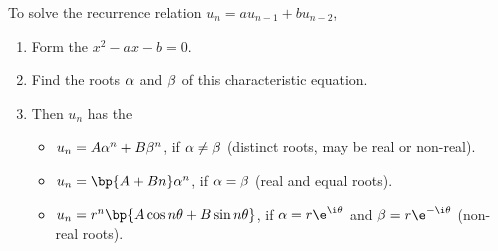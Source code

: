 \begin{recipe}
    To solve the recurrence relation $u_n = a u_{n-1} + b u_{n-2}$,
    \begin{enumerate}
        \item Form the  $x^2 - ax - b = 0$.
        \item Find the roots $\alpha$ and $\beta$ of this characteristic equation.
        \item Then $u_n$ has the  
        \begin{itemize}
            \item $u_n = A\alpha^n + B\beta^n$, if $\alpha \neq \beta$ (distinct roots, may be real or non-real).
            \item $u_n = \bp{A + Bn} \a^n$, if $\alpha = \beta$ (real and equal roots).
            \item $u_n = r^n\bp{A \cos n\t + B \sin n\t}$, if $\a = r\e^{\i \t}$ and $\b = r\e^{-\i \t}$ (non-real roots).
        \end{itemize}
    \end{enumerate}
\end{recipe}
